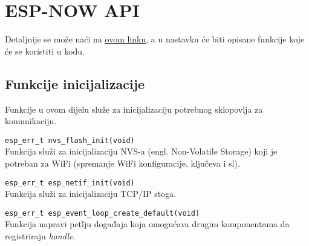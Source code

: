 \documentclass[seminarskirad]{fer}
\begin{document}

\section{ESP-NOW API}

Detaljnije se može naći na \hyperlink{https://docs.espressif.com/projects/esp-idf/en/v5.4/esp32/api-reference/}{ovom linku}, a u nastavku će biti opisane funkcije koje će se koristiti u kodu.

\subsection{Funkcije inicijalizacije}

Funkcije u ovom dijelu služe za inicijalizaciju potrebnog sklopovlja za komunikaciju.

\verb|esp_err_t nvs_flash_init(void)| \\
Funkcija služi za inicijalizaciju NVS-a (engl. Non-Volatile Storage) koji je potreban za WiFi (spremanje WiFi konfiguracije, ključeva i sl).

\verb|esp_err_t esp_netif_init(void)| \\
Funkcija služi za inicijalizaciju TCP/IP stoga.

\verb|esp_err_t esp_event_loop_create_default(void)| \\
Funkcija napravi petlju događaja koja omogućava drugim komponentama da registriraju \textit{handle}.
\end{document}
